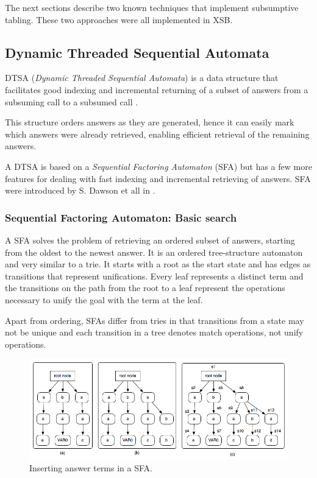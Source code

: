 The next sections describe two known techniques that implement subsumptive tabling. These two approaches were all implemented in XSB.

  \subsection{Dynamic Threaded Sequential Automata}\label{sec:dtsa}

  DTSA (\textit{Dynamic Threaded Sequential Automata}) is a data structure that facilitates good indexing and incremental
  returning of a subset of answers from a subsuming call to a subsumed call \cite{Rao-96}.
  
  This structure orders answers as they are generated, hence it can easily mark which answers were already retrieved, enabling
  efficient retrieval of the remaining answers.
  
  A DTSA is based on a \textit{Sequential Factoring Automaton} (SFA) but has a few more features for dealing with fast indexing
  and incremental retrieving of answers. SFA were introduced by S. Dawson et all in \cite{Dawnson-95}. 
  
  \subsubsection{Sequential Factoring Automaton: Basic search}
  
  A SFA solves the problem of retrieving an ordered subset of answers, starting from the oldest to the newest answer. It is an ordered
  tree-structure automaton and very similar to a trie. It starts with a root as the start state and has edges as transitions
  that represent unifications. Every leaf represents a distinct term and the transitions on the path from the root to a leaf
  represent the operations necessary to unify the goal with the term at the leaf.
  
  Apart from ordering, SFAs differ from tries in that transitions from a state may not be unique and each transition in a tree
  denotes match operations, not unify operations.
  
  \begin{figure}[ht]
    \centering
      \includegraphics[scale=0.6]{sfa.png}
    \caption{Inserting answer terms in a SFA.}
    \label{fig:sfa_example}
  \end{figure}
  
